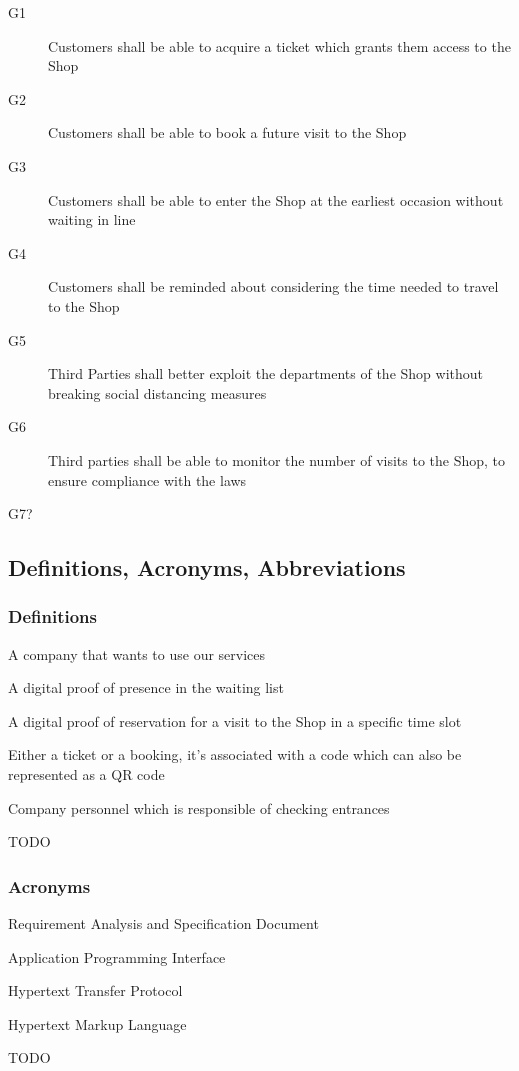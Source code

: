 \begin{description}
    \item [G1] Customers shall be able to acquire a ticket which grants them access to the Shop
    \item [G2]  Customers shall be able to book a future visit to the Shop
    \item [G3]  Customers shall be able to enter the Shop at the earliest occasion without waiting in line
    \item [G4]  Customers shall be reminded about considering the time needed to travel to the Shop
    \item [G5]  Third Parties shall better exploit the departments of the Shop without breaking social distancing measures
    \item [G6]  Third parties shall be able to monitor the number of visits to the Shop, to ensure compliance with the laws
    \item [G7?] 

\end{description}

\subsection{Definitions, Acronyms, Abbreviations}
\subsubsection{Definitions}
\begin{description}
    \item [Third party company] A company that wants to use our services
    \item [Ticket] A digital proof of presence in the waiting list
    \item [Booking] A digital proof of reservation for a visit to the Shop in a specific time slot
    \item [Token] Either a ticket or a booking, it's associated with a code which can also be represented as a QR code
    \item [Staff] Company personnel which is responsible of checking entrances
          {\todo
    \item \huge TODO
          }
\end{description}
\subsubsection{Acronyms}
\begin{description}
    \item [RASD] Requirement Analysis and Specification Document
    \item [API] Application Programming Interface
    \item [HTTP] Hypertext Transfer Protocol
    \item [HTML] Hypertext Markup Language
          {\todo
    \item \huge TODO
          }
\end{description}
